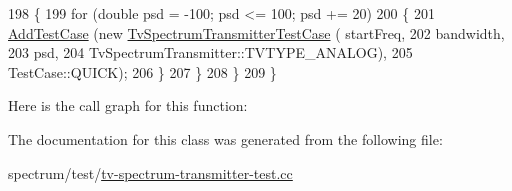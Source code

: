 \begin{DoxyCode}
198         \{
199           \textcolor{keywordflow}{for} (\textcolor{keywordtype}{double} psd = -100; psd <= 100; psd += 20)
200             \{
201               \hyperlink{classns3_1_1TestCase_a3718088e3eefd5d6454569d2e0ddd835}{AddTestCase} (\textcolor{keyword}{new} \hyperlink{classTvSpectrumTransmitterTestCase}{TvSpectrumTransmitterTestCase} (
      startFreq, 
202                                                               bandwidth, 
203                                                               psd, 
204                                                               TvSpectrumTransmitter::TVTYPE\_ANALOG), 
205                            TestCase::QUICK);
206             \}
207         \}
208     \}
209 \}
\end{DoxyCode}


Here is the call graph for this function\+:




The documentation for this class was generated from the following file\+:\begin{DoxyCompactItemize}
\item 
spectrum/test/\hyperlink{tv-spectrum-transmitter-test_8cc}{tv-\/spectrum-\/transmitter-\/test.\+cc}\end{DoxyCompactItemize}

